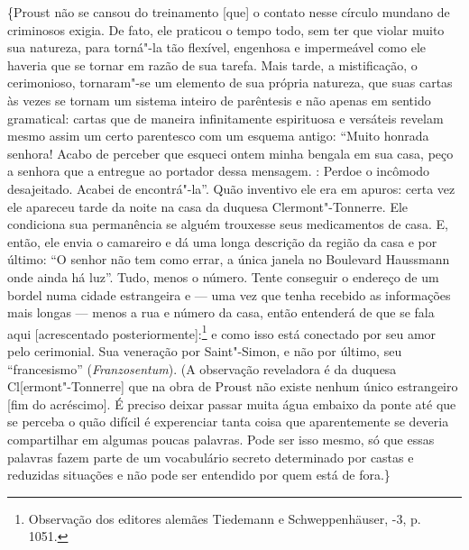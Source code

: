 \{Proust não se cansou do treinamento {[}que{]} o contato nesse círculo
mundano de criminosos exigia. De fato, ele praticou o tempo todo, sem
ter que violar muito sua natureza, para torná"-la tão flexível, engenhosa
e impermeável como ele haveria que se tornar em razão de sua tarefa.
Mais tarde, a mistificação, o cerimonioso, tornaram"-se um elemento de
sua própria natureza, que suas cartas às vezes se tornam um sistema
inteiro de parêntesis e não apenas em sentido gramatical: cartas que de
maneira infinitamente espirituosa e versáteis revelam mesmo assim um
certo parentesco com um esquema antigo: ``Muito honrada senhora! Acabo
de perceber que esqueci ontem minha bengala em sua casa, peço a senhora
que a entregue ao portador dessa mensagem. : Perdoe o incômodo
desajeitado. Acabei de encontrá"-la''. Quão inventivo ele era em apuros:
certa vez ele apareceu tarde da noite na casa da duquesa
Clermont"-Tonnerre. Ele condiciona sua permanência se alguém trouxesse
seus medicamentos de casa. E, então, ele envia o camareiro e dá uma
longa descrição da região da casa e por último: ``O senhor não tem como
errar, a única janela no Boulevard Haussmann onde ainda há luz''. Tudo,
menos o número. Tente conseguir o endereço de um bordel numa cidade
estrangeira e --- uma vez que tenha recebido as informações mais longas ---
menos a rua e número da casa, então entenderá de que se fala aqui
{[}acrescentado posteriormente{]}:\footnote{Observação dos editores
  alemães Tiedemann e Schweppenhäuser, -3, p. 1051. \versal{[N. E.]}} e
como isso está conectado por seu amor pelo cerimonial. Sua veneração por
Saint"-Simon, e não por último, seu ``francesismo'' (\emph{Franzosentum}).
(A observação reveladora é da duquesa Cl{[}ermont"-Tonnerre{]} que na
obra de Proust não existe nenhum único estrangeiro {[}fim do
acréscimo{]}. É preciso deixar passar muita água embaixo da ponte até
que se perceba o quão difícil é experenciar tanta coisa que
aparentemente se deveria compartilhar em algumas poucas palavras. Pode
ser isso mesmo, só que essas palavras fazem parte de um vocabulário
secreto determinado por castas e reduzidas situações e não pode ser
entendido por quem está de fora.\}

